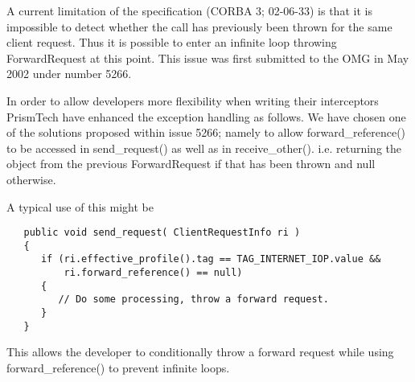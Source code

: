 A current limitation of the specification (CORBA 3; 02-06-33) is that it is
impossible to detect whether the call has previously been thrown for the same
client request. Thus it is possible to enter an infinite loop throwing
ForwardRequest at this point. This issue was first submitted to the OMG in
May 2002 under number 5266.

In order to allow developers more flexibility when writing their interceptors
PrismTech have enhanced the exception handling as follows. We have chosen one of
the solutions proposed within issue 5266; namely to allow forward\_reference()
to be accessed in send\_request() as well as in receive\_other(). i.e. returning
the object from the previous ForwardRequest if that has been thrown and null
otherwise.

A typical use of this might be
\begin{verbatim}
   public void send_request( ClientRequestInfo ri )
   {
      if (ri.effective_profile().tag == TAG_INTERNET_IOP.value &&
          ri.forward_reference() == null)
      {
         // Do some processing, throw a forward request.
      }
   }
\end{verbatim}
This allows the developer to conditionally throw a forward request while using
forward\_reference() to prevent infinite loops.


